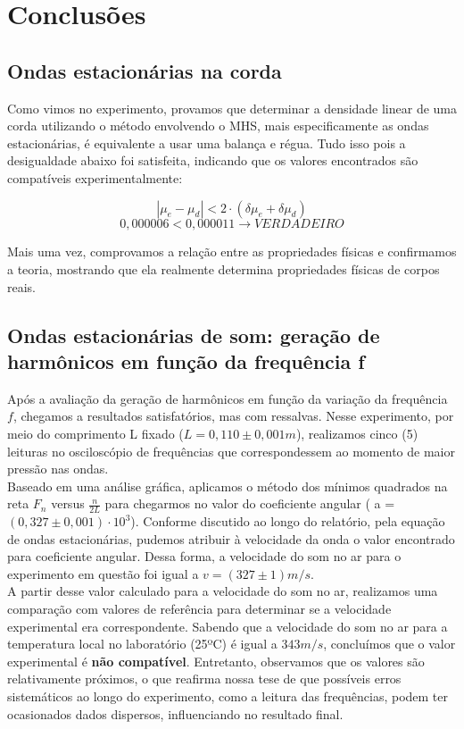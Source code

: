 \newpage
\section{Conclusões}

\subsection{Ondas estacionárias na corda}

Como vimos no experimento, provamos que determinar a densidade linear de uma corda utilizando o método envolvendo o MHS, mais especificamente as ondas estacionárias, é equivalente a usar uma balança e régua. Tudo isso pois a desigualdade abaixo foi satisfeita, indicando que os valores encontrados são compatíveis experimentalmente:

\[ |\mu_e - \mu_d| < 2 \cdot (\delta \mu_e + \delta \mu_d) \]
\[ 0,000006 < 0,000011 \xrightarrow{} VERDADEIRO \]

Mais uma vez, comprovamos a relação entre as propriedades físicas e confirmamos a teoria, mostrando que ela realmente determina propriedades físicas de corpos reais.

\subsection{Ondas estacionárias de som: geração de harmônicos
em função da frequência f}

Após a avaliação da geração de harmônicos em função da variação da frequência $f$, chegamos a resultados satisfatórios, mas com ressalvas. Nesse experimento, por meio do comprimento L fixado ($L = 0,110 \pm 0,001 m$), realizamos cinco (5) leituras no osciloscópio de frequências que correspondessem ao momento de maior pressão nas ondas. \\

Baseado em uma análise gráfica, aplicamos o método dos mínimos quadrados na reta $F_n$ versus $\frac{n}{2L}$ para chegarmos no valor do coeficiente angular ( a = $(0,327 \pm 0,001)\cdot 10^3$). Conforme discutido ao longo do relatório, pela equação de ondas estacionárias, pudemos atribuir à velocidade da onda o valor encontrado para coeficiente angular. Dessa forma, a velocidade do som no ar para o experimento em questão foi igual a $v = (327 \pm 1) m/s$.\\

A partir desse valor calculado para a velocidade do som no ar, realizamos uma comparação com valores de referência para determinar se a velocidade experimental era correspondente. Sabendo que a velocidade do som no ar para a temperatura local no laboratório (25ºC) é igual a $343 m/s$, concluímos que o valor experimental é \textbf{não compatível}. Entretanto, observamos que os valores são relativamente próximos, o que reafirma nossa tese de que possíveis erros sistemáticos ao longo do experimento, como a leitura das frequências, podem ter ocasionados dados dispersos, influenciando no resultado final. \\


